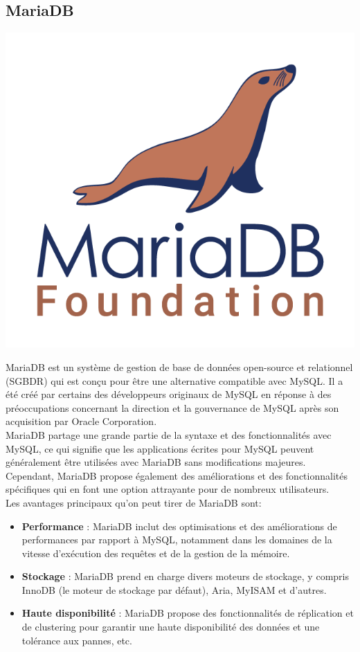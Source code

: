 		\subsection{MariaDB}
			\begin{center}
				\includegraphics[scale=0.5]{chap_3/mariadb.png}
				\label{MariaDB}
				\cite{mariaDB_image}
			\end{center}
		MariaDB est un système de gestion de base de données open-source et relationnel (SGBDR) qui est conçu pour être une alternative compatible avec MySQL. Il a été créé par certains des développeurs originaux de MySQL en réponse à des préoccupations concernant la direction et la gouvernance de MySQL après son acquisition par Oracle Corporation.\\
		MariaDB partage une grande partie de la syntaxe et des fonctionnalités avec MySQL, ce qui signifie que les applications écrites pour MySQL peuvent généralement être utilisées avec MariaDB sans modifications majeures. Cependant, MariaDB propose également des améliorations et des fonctionnalités spécifiques qui en font une option attrayante pour de nombreux utilisateurs.\\
		Les avantages principaux qu'on peut tirer de MariaDB sont:
		\begin{itemize}
			\item \textbf{Performance} : MariaDB inclut des optimisations et des améliorations de performances par rapport à MySQL, notamment dans les domaines de la vitesse d'exécution des requêtes et de la gestion de la mémoire.\cite{chatgpt}
			\item \textbf{Stockage} : MariaDB prend en charge divers moteurs de stockage, y compris InnoDB (le moteur de stockage par défaut), Aria, MyISAM et d'autres.\cite{chatgpt}
			\item \textbf{Haute disponibilité} : MariaDB propose des fonctionnalités de réplication et de clustering pour garantir une haute disponibilité des données et une tolérance aux pannes, etc.\cite{chatgpt}
		\end{itemize}
	
